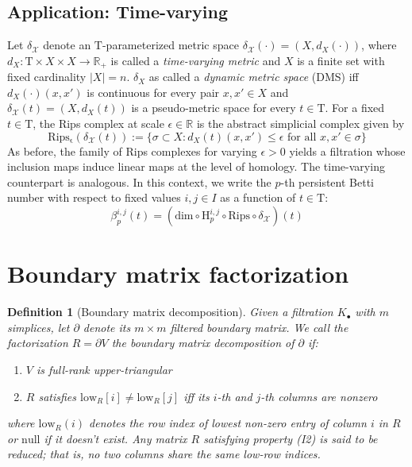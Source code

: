 \documentclass[10pt]{article}
\newcommand{\+}{%
	\raisebox{0.18ex}{\scaleobj{0.55}{+}}
}
\newtheorem{definition}{Definition}
\theoremstyle{definition}
\begin{document}


\subsection{Application: Time-varying }
Let $\delta_\mathcal{X}$ denote an $\mathrm{T}$-parameterized metric space $\delta_\mathcal{X}(\cdot) = ( X, d_X(\cdot) )$, where $d_X: \mathrm{T} \times X \times X \to \mathbb{R}_+$ is called a \emph{time-varying metric}  and $X$ is a finite set with fixed cardinality $\lvert X \rvert = n$. $\delta_X$ as called a \emph{dynamic metric space} (DMS) iff $d_X(\cdot)(x, x')$ is continuous for every pair $x, x' \in X$ and $\delta_\mathcal{X}(t) = (X, d_X(t))$ is a pseudo-metric space for every $t \in \mathrm{T}$. 
For a fixed $t \in \mathrm{T}$, the Rips complex at scale $\epsilon \in \mathbb{R}$ is the abstract simplicial complex given by 
\begin{equation}
	\mathrm{Rips_{\epsilon}}(\delta_\mathcal{X}(t)) := \{ \sigma \subset X : d_X(t)(x, x') \leq \epsilon \text{ for all } x, x' \in \sigma \}
\end{equation}
\noindent As before, the family of Rips complexes for varying $\epsilon > 0$ yields a filtration whose inclusion maps induce linear maps at the level of homology. The time-varying counterpart is analogous.  
In this context, we write the $p$-th persistent Betti number with respect to fixed values $i,j \in I$ as a function of $t \in \mathrm{T}$: 
\begin{equation}
\beta_{p}^{i,j}(t) = \left(\mathrm{dim} \circ \mathrm{H}_p^{i,j} \circ \mathrm{Rips} \circ \delta_\mathcal{X} \right)(t)
\end{equation}





\appendix

\section{Boundary matrix factorization}
\begin{definition}[Boundary matrix decomposition]
Given a filtration $K_\bullet$ with $m$ simplices, let $\partial$ denote its $m \times m$ filtered boundary matrix. We call the factorization $R = \partial V$ the \emph{boundary matrix decomposition} of $\partial$ if:
 \begin{enumerate}[labelsep=3pt, topsep=3pt, itemsep=-0.10ex,parsep=1.2ex]
 	\item[I1.] $V$ is full-rank upper-triangular
 	\item[I2.] $R$ satisfies $\mathrm{low}_R[i] \neq \mathrm{low}_R[j]$ iff its $i$-th and $j$-th columns are nonzero
 	\end{enumerate} 
 	where $\mathrm{low}_R(i)$ denotes the row index of lowest non-zero entry of column $i$ in $R$ or $\mathrm{null}$ if it doesn't exist. Any matrix $R$ satisfying property (I2) is said to be  \emph{reduced}; that is, no two columns share the same low-row indices.
\end{definition}
\end{document}
